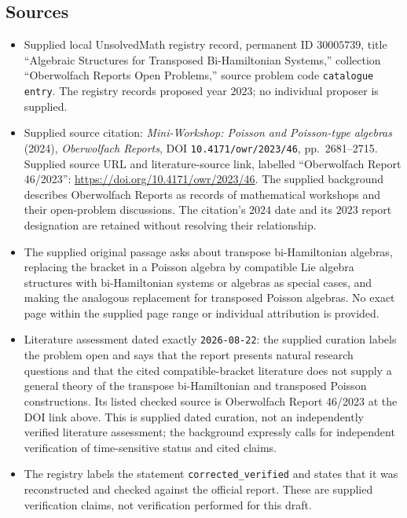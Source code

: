 \documentclass[11pt]{article}
\begin{document}
\subsection{Sources}
\begin{itemize}
\item Supplied local UnsolvedMath registry record, permanent ID \(30005739\), title ``Algebraic Structures for Transposed Bi-Hamiltonian Systems,'' collection ``Oberwolfach Reports Open Problems,'' source problem code \texttt{catalogue entry}. The registry records proposed year \(2023\); no individual proposer is supplied.
\item Supplied source citation: \emph{Mini-Workshop: Poisson and Poisson-type algebras} (2024), \emph{Oberwolfach Reports}, DOI \texttt{10.4171/owr/2023/46}, pp.\ 2681--2715. Supplied source URL and literature-source link, labelled ``Oberwolfach Report 46/2023'': \url{https://doi.org/10.4171/owr/2023/46}. The supplied background describes Oberwolfach Reports as records of mathematical workshops and their open-problem discussions. The citation's \(2024\) date and its \(2023\) report designation are retained without resolving their relationship.
\item The supplied original passage asks about transpose bi-Hamiltonian algebras, replacing the bracket in a Poisson algebra by compatible Lie algebra structures with bi-Hamiltonian systems or algebras as special cases, and making the analogous replacement for transposed Poisson algebras. No exact page within the supplied page range or individual attribution is provided.
\item Literature assessment dated exactly \texttt{2026-08-22}: the supplied curation labels the problem open and says that the report presents natural research questions and that the cited compatible-bracket literature does not supply a general theory of the transpose bi-Hamiltonian and transposed Poisson constructions. Its listed checked source is Oberwolfach Report 46/2023 at the DOI link above. This is supplied dated curation, not an independently verified literature assessment; the background expressly calls for independent verification of time-sensitive status and cited claims.
\item The registry labels the statement \texttt{corrected\_verified} and states that it was reconstructed and checked against the official report. These are supplied verification claims, not verification performed for this draft.
\end{itemize}
\end{document}
